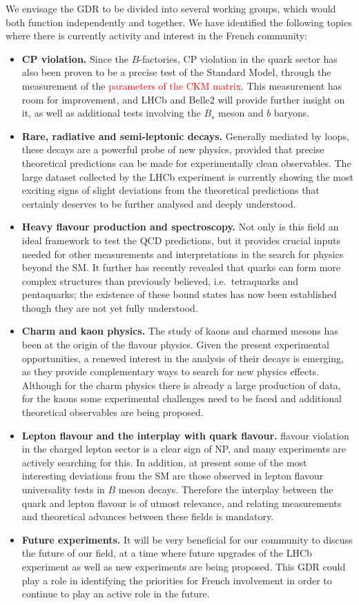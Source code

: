 We envisage the GDR to be divided into several working groups, which would both function independently and together. We have identified the following topics where there is currently activity and interest in the French community:
\begin{itemize}
\item {\bf CP violation.}  Since the $B$-factories, CP violation in the quark sector has also been proven to be a precise test of the Standard Model, through the measurement of the \textcolor{red}{parameters of the CKM matrix}. This measurement has room for improvement, and LHCb and Belle2 will provide further insight on it, as well as additional tests involving the  $B_s$ meson and $b$ baryons. 
\item {\bf Rare, radiative and semi-leptonic decays.} Generally mediated by loops, these decays are a powerful probe of new physics, provided that precise theoretical predictions can be made for experimentally clean observables. The large dataset collected by the LHCb experiment is currently showing the most exciting signs of slight deviations from the theoretical predictions that certainly deserves to be further analysed and deeply understood.
\item {\bf Heavy flavour production and spectroscopy.} Not only is this field an ideal framework to test the QCD predictions, but it provides crucial inputs needed for other measurements and interpretations in the search for physics beyond the SM.  It further has recently revealed that quarks can form more complex structures than previously believed, i.e.~tetraquarks and pentaquarks; the existence of these bound states has now been established though they are not yet fully understood. 
\item {\bf Charm and kaon physics.} The study of kaons and charmed mesons has been at the origin of the flavour physics. Given the present experimental opportunities, a renewed interest in the analysis of their decays is emerging, as they provide complementary ways to search for new physics effects.   Although for the charm physics there is already a large production of data, for the kaons some experimental challenges need to be faced and additional theoretical observables are being proposed.  
\item {\bf Lepton flavour and the interplay with quark flavour. } flavour violation in the charged lepton sector is a clear sign of NP, and many experiments are actively searching for this. In addition, at present some of the most interesting deviations from the SM are those observed in lepton flavour universality tests in $B$ meson decays. Therefore the interplay between the quark and lepton flavour is of utmost relevance, and relating measurements and theoretical advances between these fields is mandatory.
\item {\bf Future experiments.} It will be very beneficial for our community to discuss the future of our field, at a time where future upgrades of the LHCb experiment as well as new experiments are being proposed. This GDR could play a role in identifying the priorities for French involvement in order to continue to play an active role in the future. 
\end{itemize}
